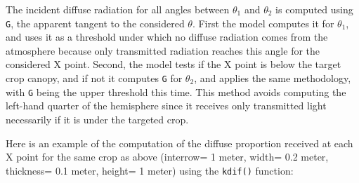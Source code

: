\documentclass[
]{book}
\begin{document}
The incident diffuse radiation for all angles between \(\theta_1\) and \(\theta_2\) is computed using \texttt{G}, the apparent tangent to the considered \(\theta\). First the model computes it for \(\theta_1\), and uses it as a threshold under which no diffuse radiation comes from the atmosphere because only transmitted radiation reaches this angle for the considered X point. Second, the model tests if the X point is below the target crop canopy, and if not it computes \texttt{G} for \(\theta_2\), and applies the same methodology, with \texttt{G} being the upper threshold this time. This method avoids computing the left-hand quarter of the hemisphere since it receives only transmitted light necessarily if it is under the targeted crop.

Here is an example of the computation of the diffuse proportion received at each X point for the same crop as above (interrow= 1 meter, width= 0.2 meter, thickness= 0.1 meter, height= 1 meter) using the \texttt{kdif()} function:
\end{document}
